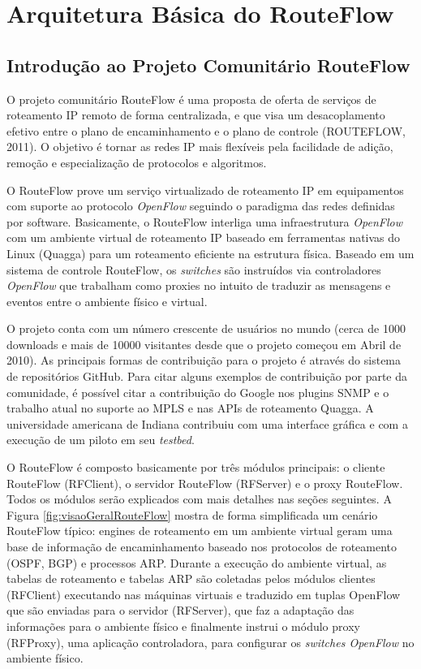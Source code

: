 \chapter{Arquitetura Básica do RouteFlow}

\section{Introdução ao Projeto Comunitário RouteFlow}

O projeto comunitário RouteFlow é uma proposta de oferta de serviços de
roteamento IP remoto de forma centralizada, e que visa um
desacoplamento efetivo entre o plano de encaminhamento e o
plano de controle (ROUTEFLOW, 2011). O objetivo é tornar as
redes IP mais flexíveis pela facilidade de adição,
remoção e especialização de protocolos e algoritmos.


O RouteFlow prove um serviço virtualizado de roteamento IP
em equipamentos com suporte ao protocolo \textit{OpenFlow}
seguindo o paradigma das redes definidas por software.
Basicamente, o RouteFlow interliga uma infraestrutura 
\textit{OpenFlow} com um ambiente virtual de roteamento 
IP baseado em ferramentas nativas do Linux (Quagga) para
um roteamento eficiente na estrutura física. Baseado em um
sistema de controle RouteFlow, os \textit{switches} 
são instruídos via controladores \textit{OpenFlow} que 
trabalham como proxies no intuito de traduzir as mensagens
e eventos entre o ambiente físico e virtual. 

O projeto conta com um número crescente de usuários no 
mundo (cerca de 1000 downloads e mais de 10000 visitantes
desde que o projeto começou em Abril de 2010). As principais
formas de contribuição para o projeto é através do sistema
de repositórios GitHub. Para citar alguns exemplos de contribuição
por parte da comunidade, é possível citar a contribuição
do Google nos plugins SNMP e o trabalho atual no suporte
ao MPLS e nas APIs de roteamento Quagga. A universidade
americana de Indiana contribuiu com uma interface gráfica
e com a execução de um piloto em seu \textit{testbed}.


O RouteFlow é composto basicamente por três módulos principais:
o cliente RouteFlow (RFClient), o servidor RouteFlow (RFServer) e
o proxy RouteFlow. Todos os módulos serão
explicados com mais detalhes nas seções seguintes. A Figura \ref{fig:visaoGeralRouteFlow} mostra
de forma simplificada um cenário RouteFlow típico: engines de 
roteamento em um ambiente virtual geram uma base de 
informação de encaminhamento baseado nos protocolos 
de roteamento (OSPF, BGP) e processos ARP. Durante a 
execução do ambiente virtual, as tabelas de roteamento e 
tabelas ARP são coletadas pelos módulos clientes (RFClient) executando
nas máquinas virtuais e traduzido em tuplas OpenFlow que
são enviadas para o servidor (RFServer), que faz a adaptação das 
informações para o ambiente físico e finalmente instrui o 
módulo proxy (RFProxy), uma aplicação controladora, para configurar
os \textit{switches OpenFlow} no ambiente físico.


